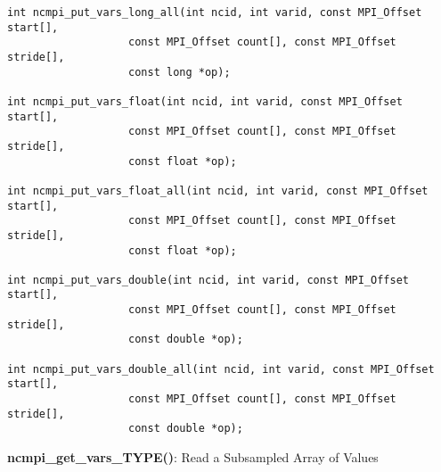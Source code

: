 \begin{verbatim}
int ncmpi_put_vars_long_all(int ncid, int varid, const MPI_Offset start[],
                   const MPI_Offset count[], const MPI_Offset stride[],
                   const long *op);

int ncmpi_put_vars_float(int ncid, int varid, const MPI_Offset start[],
                   const MPI_Offset count[], const MPI_Offset stride[],
                   const float *op);

int ncmpi_put_vars_float_all(int ncid, int varid, const MPI_Offset start[],
                   const MPI_Offset count[], const MPI_Offset stride[],
                   const float *op);

int ncmpi_put_vars_double(int ncid, int varid, const MPI_Offset start[],
                   const MPI_Offset count[], const MPI_Offset stride[],
                   const double *op);

int ncmpi_put_vars_double_all(int ncid, int varid, const MPI_Offset start[],
                   const MPI_Offset count[], const MPI_Offset stride[],
                   const double *op);
\end{verbatim}


{\bf ncmpi\_get\_vars\_TYPE()}: Read a Subsampled Array of Values

